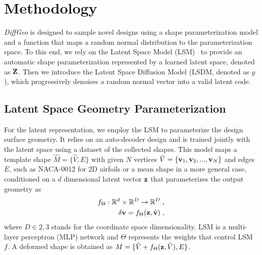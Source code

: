 \section{Methodology }
\label{ch6:sec:method}

\textit{DiffGeo} is designed to sample novel designs using a shape parameterization model and a function that maps a random normal distribution to the parameterization space.
To this end, we rely on the Latent Space Model (LSM)~\cite{aa.Wei2023,aa.Wei2023b} to provide an automatic shape parameterization represented by a learned latent space, denoted as $\mathbf{Z}$.
Then we introduce the Latent Space Diffusion Model (LSDM, denoted as $g$), which progressively denoises a random normal vector into a valid latent code.

\subsection{Latent Space Geometry Parameterization}
For the latent representation, we employ the LSM to parameterize the design surface geometry. It relies on an auto-decoder design \cite{ai.Tan1995, ai.Park2019c} and is trained jointly with the latent space using a dataset of the collected shapes. This model maps a template shape $\hat{M}=\{\hat{V}, E\}$ with given $N$ vertices $\hat{V}=\{\mathbf{v}_1, \mathbf{v}_2,...,\mathbf{v}_N\}$ and edges $E$, such as NACA-0012 for 2D airfoils or a mean shape in a more general case, conditioned on a $d$ dimensional latent vector $\mathbf{z}$ that parameterizes the output geometry as
\begin{align}
    f_{\Theta} : \mathbb{R}^d \times \mathbb{R}^D \rightarrow \mathbb{R}^D \; , \label{ch6:eq:map_lsm} \\
    \mathbf{\delta v} = f_{\Theta}(\mathbf{z}, \hat{\mathbf{v}}) \; , \nonumber
\end{align} 
where $D\in {2,3}$ stands for the coordinate space dimensionality. 
LSM is a multi-layer perceptron (MLP) network and $\Theta$ represents the weights that control LSM $f$.
A deformed shape is obtained as $M=\{\hat{V} + f_{\Theta}(\mathbf{z}, \hat{V}), E\}$. 


